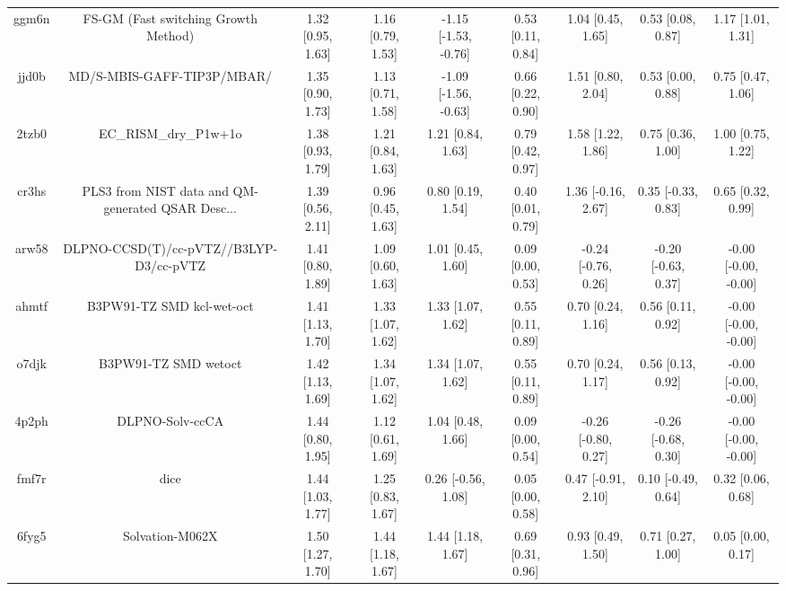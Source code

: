 \documentclass{article}
\begin{document}
\begin{center}
\begin{longtable}{|ccccccccc|}
 ggm6n &               FS-GM (Fast switching Growth Method) &  1.32 [0.95, 1.63] &  1.16 [0.79, 1.53] &  -1.15 [-1.53, -0.76] &  0.53 [0.11, 0.84] &    1.04 [0.45, 1.65] &    0.53 [0.08, 0.87] &     1.17 [1.01, 1.31] \\
 jjd0b &                         MD/S-MBIS-GAFF-TIP3P/MBAR/ &  1.35 [0.90, 1.73] &  1.13 [0.71, 1.58] &  -1.09 [-1.56, -0.63] &  0.66 [0.22, 0.90] &    1.51 [0.80, 2.04] &    0.53 [0.00, 0.88] &     0.75 [0.47, 1.06] \\
 2tzb0 &                              EC\_RISM\_dry\_P1w+1o &  1.38 [0.93, 1.79] &  1.21 [0.84, 1.63] &     1.21 [0.84, 1.63] &  0.79 [0.42, 0.97] &    1.58 [1.22, 1.86] &    0.75 [0.36, 1.00] &     1.00 [0.75, 1.22] \\
 cr3hs &  PLS3 from NIST data and QM-generated QSAR Desc... &  1.39 [0.56, 2.11] &  0.96 [0.45, 1.63] &     0.80 [0.19, 1.54] &  0.40 [0.01, 0.79] &   1.36 [-0.16, 2.67] &   0.35 [-0.33, 0.83] &     0.65 [0.32, 0.99] \\
 arw58 &            DLPNO-CCSD(T)/cc-pVTZ//B3LYP-D3/cc-pVTZ &  1.41 [0.80, 1.89] &  1.09 [0.60, 1.63] &     1.01 [0.45, 1.60] &  0.09 [0.00, 0.53] &  -0.24 [-0.76, 0.26] &  -0.20 [-0.63, 0.37] &  -0.00 [-0.00, -0.00] \\
 ahmtf &                          B3PW91-TZ SMD kcl-wet-oct &  1.41 [1.13, 1.70] &  1.33 [1.07, 1.62] &     1.33 [1.07, 1.62] &  0.55 [0.11, 0.89] &    0.70 [0.24, 1.16] &    0.56 [0.11, 0.92] &  -0.00 [-0.00, -0.00] \\
 o7djk &                               B3PW91-TZ SMD wetoct &  1.42 [1.13, 1.69] &  1.34 [1.07, 1.62] &     1.34 [1.07, 1.62] &  0.55 [0.11, 0.89] &    0.70 [0.24, 1.17] &    0.56 [0.13, 0.92] &  -0.00 [-0.00, -0.00] \\
 4p2ph &                                    DLPNO-Solv-ccCA &  1.44 [0.80, 1.95] &  1.12 [0.61, 1.69] &     1.04 [0.48, 1.66] &  0.09 [0.00, 0.54] &  -0.26 [-0.80, 0.27] &  -0.26 [-0.68, 0.30] &  -0.00 [-0.00, -0.00] \\
 fmf7r &                                               dice &  1.44 [1.03, 1.77] &  1.25 [0.83, 1.67] &    0.26 [-0.56, 1.08] &  0.05 [0.00, 0.58] &   0.47 [-0.91, 2.10] &   0.10 [-0.49, 0.64] &     0.32 [0.06, 0.68] \\
 6fyg5 &                                    Solvation-M062X &  1.50 [1.27, 1.70] &  1.44 [1.18, 1.67] &     1.44 [1.18, 1.67] &  0.69 [0.31, 0.96] &    0.93 [0.49, 1.50] &    0.71 [0.27, 1.00] &     0.05 [0.00, 0.17] \\

\end{longtable}
\end{center}
\end{document}
